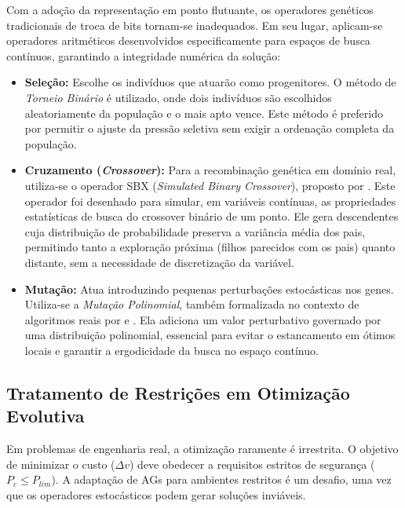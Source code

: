 Com a adoção da representação em ponto flutuante, os operadores genéticos tradicionais de troca de bits tornam-se inadequados. Em seu lugar, aplicam-se operadores aritméticos desenvolvidos especificamente para espaços de busca contínuos, garantindo a integridade numérica da solução:

\begin{itemize}
    \item \textbf{Seleção:} Escolhe os indivíduos que atuarão como progenitores. O método de \textit{Torneio Binário} é utilizado, onde dois indivíduos são escolhidos aleatoriamente da população e o mais apto vence. Este método é preferido por permitir o ajuste da pressão seletiva sem exigir a ordenação completa da população.
    
    \item \textbf{Cruzamento (\textit{Crossover}):} Para a recombinação genética em domínio real, utiliza-se o operador SBX (\textit{Simulated Binary Crossover}), proposto por . Este operador foi desenhado para simular, em variáveis contínuas, as propriedades estatísticas de busca do crossover binário de um ponto. Ele gera descendentes cuja distribuição de probabilidade preserva a variância média dos pais, permitindo tanto a exploração próxima (filhos parecidos com os pais) quanto distante, sem a necessidade de discretização da variável.
    
    \item \textbf{Mutação:} Atua introduzindo pequenas perturbações estocásticas nos genes. Utiliza-se a \textit{Mutação Polinomial}, também formalizada no contexto de algoritmos reais por  e . Ela adiciona um valor perturbativo governado por uma distribuição polinomial, essencial para evitar o estancamento em ótimos locais e garantir a ergodicidade da busca no espaço contínuo.
\end{itemize}

\subsection{Tratamento de Restrições em Otimização Evolutiva}

Em problemas de engenharia real, a otimização raramente é irrestrita. O objetivo de minimizar o custo ($\Delta v$) deve obedecer a requisitos estritos de segurança ($P_c \leq P_{lim}$). A adaptação de AGs para ambientes restritos é um desafio, uma vez que os operadores estocásticos podem gerar soluções inviáveis.

